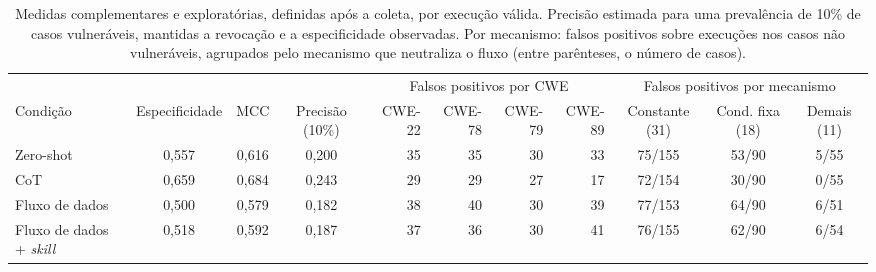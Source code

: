 \begin{table}[t]
\caption{Medidas complementares e exploratórias, definidas após a coleta, por execução válida. Precisão estimada para uma prevalência de 10\% de casos vulneráveis, mantidas a revocação e a especificidade observadas. Por mecanismo: falsos positivos sobre execuções nos casos não vulneráveis, agrupados pelo mecanismo que neutraliza o fluxo (entre parênteses, o número de casos).}
\label{tab:complementar}
\small
\setlength{\tabcolsep}{4pt}
\begin{tabular}{lcccrrrrccc}
\toprule
 & & & & \multicolumn{4}{c}{Falsos positivos por CWE} & \multicolumn{3}{c}{Falsos positivos por mecanismo} \\
\cmidrule(lr){5-8}\cmidrule(lr){9-11}
Condição & Especificidade & MCC & Precisão (10\%) & CWE-22 & CWE-78 & CWE-79 & CWE-89 & Constante (31) & Cond. fixa (18) & Demais (11) \\
\midrule
Zero-shot & 0,557 & 0,616 & 0,200 & 35 & 35 & 30 & 33 & 75/155 & 53/90 & 5/55 \\
CoT & 0,659 & 0,684 & 0,243 & 29 & 29 & 27 & 17 & 72/154 & 30/90 & 0/55 \\
Fluxo de dados & 0,500 & 0,579 & 0,182 & 38 & 40 & 30 & 39 & 77/153 & 64/90 & 6/51 \\
Fluxo de dados + \textit{skill} & 0,518 & 0,592 & 0,187 & 37 & 36 & 30 & 41 & 76/155 & 62/90 & 6/54 \\
\bottomrule
\end{tabular}
\end{table}
